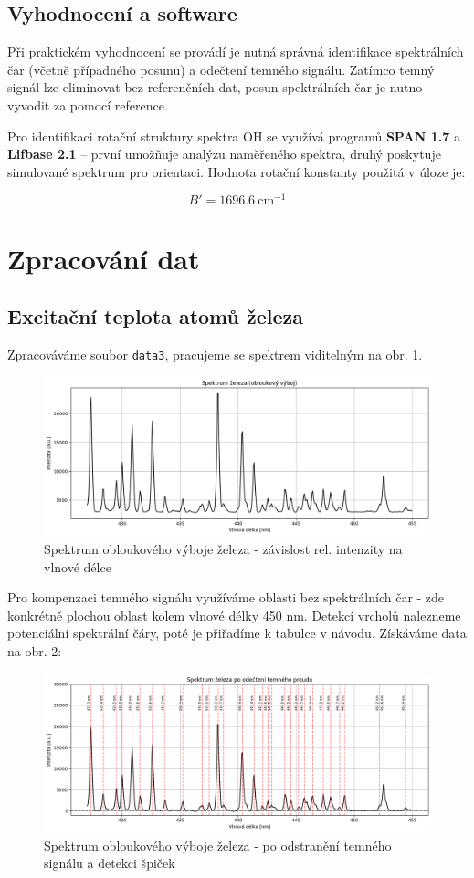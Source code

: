 \documentclass[czech,11pt,a4paper]{article}
\begin{document}
\begin{multicols}{2}
		
		\subsection{Vyhodnocení a software}
		
		Při praktickém vyhodnocení se provádí je nutná správná identifikace spektrálních čar (včetně případného posunu) a odečtení temného signálu. Zatímco temný signál lze eliminovat bez referenčních dat, posun spektrálních čar je nutno vyvodit za pomocí reference.

		
		Pro identifikaci rotační struktury spektra OH se využívá programů \textbf{SPAN 1.7} a \textbf{Lifbase 2.1} – první umožňuje analýzu naměřeného spektra, druhý poskytuje simulované spektrum pro orientaci. Hodnota rotační konstanty použitá v úloze je:
		
		\[
		B' = 1696.6\ \text{cm}^{-1}
		\]
		
		
		\section{Zpracování dat}
		\subsection{Excitační teplota atomů železa}
		Zpracováváme soubor \verb*|data3|, pracujeme se spektrem viditelným na obr. 1.
		\begin{figure}[H]
			\centering
			\includegraphics[width=0.9\linewidth]{spectrum}
			\caption{Spektrum obloukového výboje železa - závislost rel. intenzity na vlnové délce}

		\end{figure}
		Pro kompenzaci temného signálu využíváme oblasti bez spektrálních čar - zde konkrétně plochou oblast kolem vlnové délky 450 nm. Detekcí vrcholů nalezneme potenciální spektrální čáry, poté je přiřadíme k tabulce v návodu\cite{navod}. Získáváme data na obr. 2:
		
		\begin{figure}[H]
			\centering
			\includegraphics[width=0.9\linewidth]{spectrum2}
			\caption{Spektrum obloukového výboje železa - po odstranění temného signálu a detekci špiček}


\end{figure}
\end{multicols}
\end{document}
